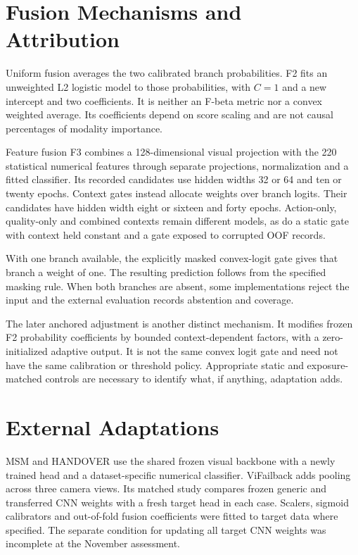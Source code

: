 \section{Fusion Mechanisms and Attribution}
Uniform fusion averages the two calibrated branch probabilities. F2 fits an unweighted
L2 logistic model to those probabilities, with $C=1$ and a new intercept and two
coefficients. It is neither an F-beta metric nor a convex weighted average. Its
coefficients depend on score scaling and are not causal percentages of modality
importance.

Feature fusion F3 combines a 128-dimensional visual projection with the 220 statistical
numerical features through separate projections, normalization and a fitted classifier.
Its recorded candidates use hidden widths 32 or 64 and ten or twenty epochs. Context
gates instead allocate weights over branch logits. Their candidates have hidden width
eight or sixteen and forty epochs. Action-only, quality-only and combined contexts
remain different models, as do a static gate with context held constant and a gate
exposed to corrupted OOF records.

With one branch available, the explicitly masked convex-logit gate gives that branch a
weight of one. The resulting prediction follows from the specified masking rule. When
both branches are absent, some implementations reject the input and the external
evaluation records abstention and coverage.

The later anchored adjustment is another distinct mechanism. It modifies frozen F2
probability coefficients by bounded context-dependent factors, with a zero-initialized
adaptive output. It is not the same convex logit gate and need not have the same
calibration or threshold policy. Appropriate static and exposure-matched controls are
necessary to identify what, if anything, adaptation adds.

\section{External Adaptations}
MSM and HANDOVER use the shared frozen visual backbone with a newly trained head and a
dataset-specific numerical classifier. ViFailback adds pooling across three camera
views. Its matched study compares frozen generic and transferred CNN weights with a
fresh target head in each case. Scalers, sigmoid calibrators and out-of-fold fusion
coefficients were fitted to target data where specified. The separate condition for
updating all target CNN weights was incomplete at the November assessment.
